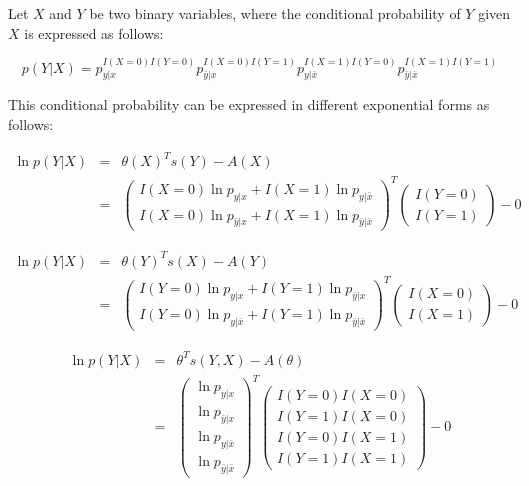 \documentclass[11pt, oneside]{article}   	%
\numberwithin{figure}{section}
\numberwithin{equation}{section}
\numberwithin{table}{section}
\begin{document}
Let $X$ and $Y$ be two binary variables, where the conditional probability of $Y$ given $X$ is expressed as follows:

$$ p(Y|X) = p_{y|x}^{I(X=0)I(Y=0)}p_{\bar{y}|x}^{I(X=0)I(Y=1)}p_{y|\bar{x}}^{I(X=1)I(Y=0)}p_{\bar{y}|\bar{x}}^{I(X=1)I(Y=1)}$$


This conditional probability can be expressed in different exponential forms as follows:


\begin{eqnarray*}
\ln p(Y|X) &=& \theta(X)^Ts(Y) - A(X) \\
&=&
\begin{pmatrix}
I(X=0)\ln p_{y|x}  + I(X=1)\ln p_{y|\bar{x}}\\
I(X=0)\ln p_{\bar{y}|x}  + I(X=1)\ln p_{\bar{y}|\bar{x}}
\end{pmatrix}^T
\begin{pmatrix}
I(Y=0) \\
I(Y=1)
\end{pmatrix}
- 0
\end{eqnarray*}


\begin{eqnarray*}
\ln p(Y|X) &=& \theta(Y)^T s(X) - A(Y) \\
&=&
\begin{pmatrix}
I(Y=0)\ln p_{y|x}  + I(Y=1)\ln p_{\bar{y}|x}\\
I(Y=0)\ln p_{y|\bar{x}}  + I(Y=1)\ln p_{\bar{y}|\bar{x}}
\end{pmatrix}^T
\begin{pmatrix}
I(X=0) \\
I(X=1)
\end{pmatrix}
- 0
\end{eqnarray*}


\begin{eqnarray*}
\ln p(Y|X) &=& \theta^T s(Y,X) - A(\theta) \\
&=&
\begin{pmatrix}
\ln p_{y|x}\\
\ln p_{\bar{y}|x}\\
\ln p_{y|\bar{x}}\\
\ln p_{\bar{y}|\bar{x}}
\end{pmatrix}^T
\begin{pmatrix}
I(Y=0)I(X=0) \\
I(Y=1)I(X=0) \\
I(Y=0)I(X=1) \\
I(Y=1)I(X=1) 
\end{pmatrix}
- 0
\end{eqnarray*}



%
%
\end{document}

